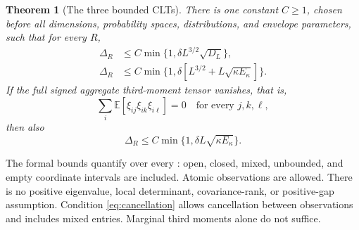 \documentclass[11pt]{article}
\newtheorem{theorem}{Theorem}
\newcommand{\E}{\mathbb E}
\begin{document}
\begin{theorem}[The three bounded CLTs]
There is one constant $C\ge1$, chosen before all dimensions, probability
spaces, distributions, and envelope parameters, such that for every $R$,
\begin{align}
 \Delta_R&\le C\min\{1,\delta L^{3/2}\sqrt{D_L}\},\label{eq:general}\\
 \Delta_R&\le C\min\{1,\delta[L^{3/2}+L\sqrt{\kappa E_\kappa}]\}.
 \label{eq:gap}
\end{align}
If the full signed aggregate third-moment tensor vanishes, that is,
\begin{equation}
 \sum_i\E[\xi_{ij}\xi_{ik}\xi_{i\ell}]=0
 \quad\text{for every }j,k,\ell,\label{eq:cancellation}
\end{equation}
then also
\begin{equation}
 \Delta_R\le C\min\{1,\delta L\sqrt{\kappa E_\kappa}\}.
 \label{eq:zero}
\end{equation}
\end{theorem}

The formal bounds quantify over every : open, closed,
mixed, unbounded, and empty coordinate intervals are included. Atomic
observations are allowed. There is no positive eigenvalue, local
determinant, covariance-rank, or positive-gap assumption. Condition
\eqref{eq:cancellation} allows cancellation between observations and
includes mixed entries. Marginal third moments alone do not suffice.
\end{document}
